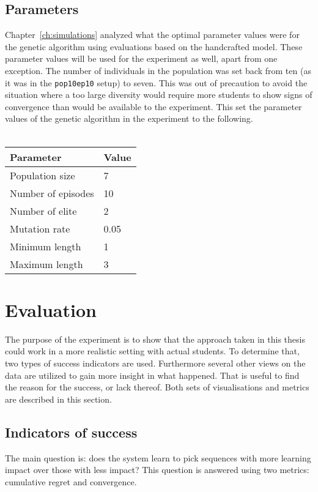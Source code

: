 \subsection{Parameters}
\label{sec:setup_params}
Chapter~\ref{ch:simulations} analyzed what the optimal parameter values were
for the genetic algorithm using evaluations based on the handcrafted model.
These parameter values will be used for the experiment as well, apart from one
exception. The number of individuals in the population was set back from ten
(as it was in the \texttt{pop10ep10} setup) to seven. This was out of precaution to
avoid the situation where a too large diversity would require more students to
show signs of convergence than would be available to the experiment. This set
the parameter values of the genetic algorithm in the experiment to the
following.\\\\
\begin{tabular}{ll}\hline
	\textbf{Parameter} &  \textbf{Value}\\\hline
	Population size & 7 \\
	Number of episodes & 10 \\
	Number of elite & 2 \\
	Mutation rate & 0.05 \\
	Minimum length & 1 \\
	Maximum length & 3 \\
\end{tabular}

\section{Evaluation}
\label{sec:setup_eval}
The purpose of the experiment is to show that the approach taken in this thesis
could work in a more realistic setting with actual students. To determine that,
two types of success indicators are used. Furthermore several other views on
the data are utilized to gain more insight in what happened. That is useful to
find the reason for the success, or lack thereof. Both sets of visualisations
and metrics are described in this section.
\subsection{Indicators of success}
The main question is: does the system learn to pick sequences with
more learning impact over those with less impact? This
question is answered using two metrics: cumulative regret and convergence.
